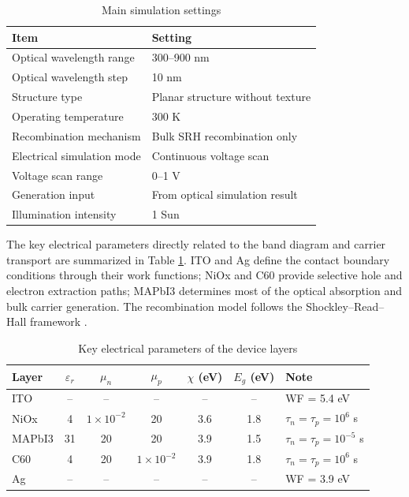 \documentclass[12pt,a4paper,UTF8]{article}
\begin{document}
\begin{table}[H]
    \centering
    \caption{Main simulation settings}
    \begin{tabular}{@{}ll@{}}
        \toprule
        Item & Setting \\
        \midrule
        Optical wavelength range & 300--900 nm \\
        Optical wavelength step & 10 nm \\
        Structure type & Planar structure without texture \\
        Operating temperature & 300 K \\
        Recombination mechanism & Bulk SRH recombination only \\
        Electrical simulation mode & Continuous voltage scan \\
        Voltage scan range & 0--1 V \\
        Generation input & From optical simulation result \\
        Illumination intensity & 1 Sun \\
        \bottomrule
    \end{tabular}
\end{table}

The key electrical parameters directly related to the band diagram and carrier transport are summarized in Table \ref{tab:key-elec-params}. ITO and Ag define the contact boundary conditions through their work functions; NiOx and C60 provide selective hole and electron extraction paths; MAPbI3 determines most of the optical absorption and bulk carrier generation. The recombination model follows the Shockley--Read--Hall framework \cite{sze2007}.

\begin{table}[H]
    \centering
    \caption{Key electrical parameters of the device layers}
    \label{tab:key-elec-params}
    \small
    \begin{tabular}{@{}lccccc l@{}}
        \toprule
        Layer & $\varepsilon_r$ & $\mu_n$ & $\mu_p$ & $\chi$ (eV) & $E_g$ (eV) & Note \\
        \midrule
        ITO & -- & -- & -- & -- & -- & WF = 5.4 eV \\
        NiOx & 4 & $1\times10^{-2}$ & 20 & 3.6 & 1.8 & $\tau_n=\tau_p=10^6$ s \\
        MAPbI3 & 31 & 20 & 20 & 3.9 & 1.5 & $\tau_n=\tau_p=10^{-5}$ s \\
        C60 & 4 & 20 & $1\times10^{-2}$ & 3.9 & 1.8 & $\tau_n=\tau_p=10^6$ s \\
        Ag & -- & -- & -- & -- & -- & WF = 3.9 eV \\
        \bottomrule
    \end{tabular}
\end{table}
\end{document}

